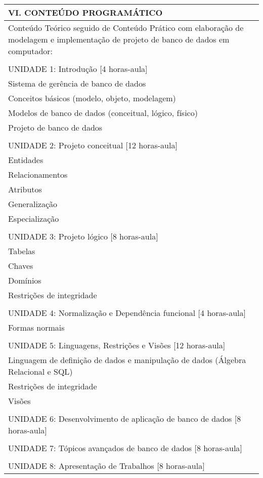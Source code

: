 \documentclass[12pt]{article}
\begin{document}
\begin{longtable}{|L{1.025\textwidth}|} \hline
%
{\bf VI. CONTEÚDO PROGRAMÁTICO } \\ \hline
Conteúdo Teórico seguido de Conteúdo Prático com elaboração de modelagem e implementação de projeto de banco de dados em computador: \\
\\
UNIDADE 1: Introdução [4 horas-aula]\\
Sistema de gerência de banco de dados\\
Conceitos básicos (modelo, objeto, modelagem)\\
Modelos de banco de dados (conceitual, lógico, físico)\\
Projeto de banco de dados\\
\\
UNIDADE 2: Projeto conceitual [12 horas-aula]\\
 Entidades\\
 Relacionamentos\\
 Atributos\\
 Generalização\\
 Especialização\\
\\
UNIDADE 3: Projeto lógico [8 horas-aula]\\
 Tabelas\\
 Chaves\\
 Domínios\\
Restrições de integridade\\
\\
UNIDADE 4: Normalização e Dependência funcional [4 horas-aula]\\
Formas normais\\
\\
UNIDADE 5: Linguagens, Restrições e Visões [12 horas-aula]\\
 Linguagem de definição de dados e manipulação de dados (Álgebra Relacional e SQL)\\
 Restrições de integridade\\
 Visões\\
\\
UNIDADE 6: Desenvolvimento de aplicação de banco de dados [8 horas-aula]\\
\\
UNIDADE 7: Tópicos avançados de banco de dados [8 horas-aula]\\
\\
UNIDADE 8: Apresentação de Trabalhos [8 horas-aula]

\\ \hline
\end{longtable} 
\end{document}
